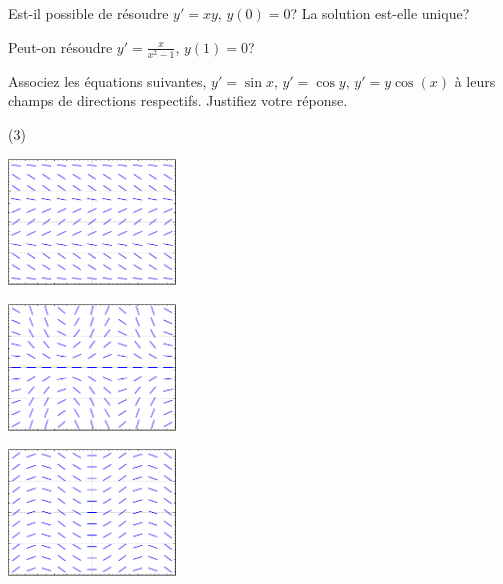 \begin{exercise}
Est-il possible de résoudre $y' = xy$, $y(0) = 0$?  La solution est-elle unique?
\end{exercise}

\begin{exercise}Peut-on résoudre $y' = \frac{x}{x^2-1}$, $y(1) = 0$?
\end{exercise}

\begin{samepage}
\begin{exercise}
Associez les équations suivantes, $y'=\sin x$, $y'=\cos y$, $y' = y\cos(x)$ à leurs champs de directions respectifs.
Justifiez votre réponse.
\begin{tasks}(3)
\task
\parbox[c]{1.75in}{\includegraphics[width=1.75in]{figures/yprimecosyslope}}
\task
\parbox[c]{1.75in}{\includegraphics[width=1.75in]{figures/yprimecosxyslope}}
\task
\parbox[c]{1.75in}{\includegraphics[width=1.75in]{figures/yprimesinxslope}}
\end{tasks}
\end{exercise}
\end{samepage}

